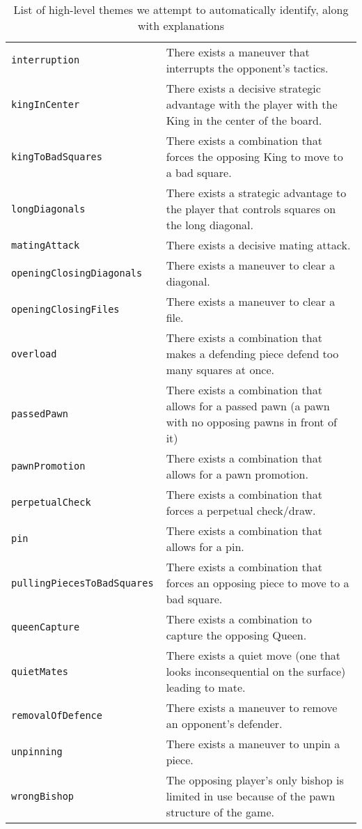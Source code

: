 \documentclass[11pt]{article}
\begin{document}
\begin{table*}
\begin{tabular}{lp{}}
\tt{interruption} & There exists a maneuver that interrupts the opponent’s tactics. \\
\tt{kingInCenter} & There exists a decisive strategic advantage with the player with the King in the center of the board. \\
\tt{kingToBadSquares} & There exists a combination that forces the opposing King to move to a bad square. \\
\tt{longDiagonals} & There exists a strategic advantage to the player that controls squares on the long diagonal. \\
\tt{matingAttack} & There exists a decisive mating attack. \\
\tt{openingClosingDiagonals} & There exists a maneuver to clear a diagonal. \\
\tt{openingClosingFiles} & There exists a maneuver to clear a file. \\
\tt{overload} & There exists a combination that makes a defending piece defend too many squares at once. \\
\tt{passedPawn} & There exists a combination that allows for a passed pawn (a pawn with no opposing pawns in front of it) \\
\tt{pawnPromotion} & There exists a combination that allows for a pawn promotion. \\
\tt{perpetualCheck} & There exists a combination that forces a perpetual check/draw. \\
\tt{pin} & There exists a combination that allows for a pin. \\
\tt{pullingPiecesToBadSquares} & There exists a combination that forces an opposing piece to move to a bad square. \\
\tt{queenCapture} & There exists a combination to capture the opposing Queen. \\
\tt{quietMates} & There exists a quiet move (one that looks inconsequential on the surface) leading to mate. \\
\tt{removalOfDefence} & There exists a maneuver to remove an opponent’s defender. \\
\tt{unpinning} & There exists a maneuver to unpin a piece. \\
\tt{wrongBishop} & The opposing player’s only bishop is limited in use because of the pawn structure of the game. \\ \hline
\end{tabular}
\caption{List of high-level themes we attempt to automatically identify, along with explanations}
\label{table:themes}
\end{table*}
\end{document}
